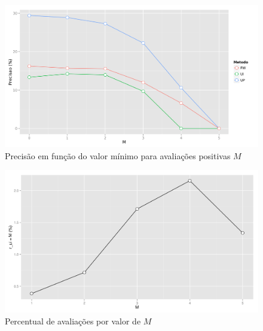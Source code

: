 {\begin{figure}[hp]
    \begin{center}
    \includegraphics[width=1\textwidth]{img/precision_M}
    \end{center}
    \caption{Precisão em função do valor mínimo para avaliações positivas $M$}
    \label{fig:precision_M}
\end{figure}

\begin{figure}[hp]
    \begin{center}
    \includegraphics[width=1\textwidth]{img/percentual_M}
    \end{center}
    \caption{Percentual de avaliações por valor de $M$}
    \label{fig:percentual_M}
\end{figure}

}
